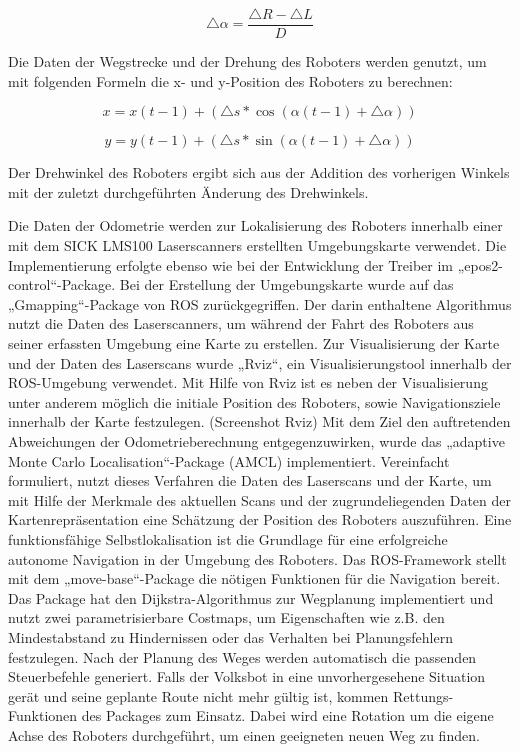 \begin{equation}
\triangle \alpha = \dfrac{\triangle R - \triangle L}{D}
\end{equation} 

Die Daten der Wegstrecke und der Drehung des Roboters werden genutzt, um mit folgenden Formeln die x- und y-Position des Roboters zu berechnen:

\begin{equation}
x = x(t-1) + (\triangle s * \cos (\alpha (t-1) + \triangle \alpha))
\end{equation} 

\begin{equation}
y = y(t-1) + (\triangle s * \sin (\alpha (t-1) + \triangle \alpha))
\end{equation} 

Der Drehwinkel des Roboters ergibt sich aus der Addition des vorherigen Winkels mit der zuletzt durchgeführten Änderung des Drehwinkels.



Die Daten der Odometrie werden zur Lokalisierung des Roboters innerhalb einer mit dem SICK LMS100 Laserscanners erstellten Umgebungskarte verwendet. Die Implementierung erfolgte ebenso wie bei der Entwicklung der Treiber im „epos2-control“-Package. Bei der Erstellung der Umgebungskarte wurde auf das „Gmapping“-Package von ROS zurückgegriffen. Der darin enthaltene Algorithmus nutzt die Daten des Laserscanners, um während der Fahrt des Roboters aus seiner erfassten Umgebung eine Karte zu erstellen. Zur Visualisierung der Karte und der Daten des Laserscans wurde „Rviz“, ein Visualisierungstool innerhalb der ROS-Umgebung verwendet. Mit Hilfe von Rviz ist es neben der Visualisierung unter anderem möglich die initiale Position des Roboters, sowie Navigationsziele innerhalb der Karte festzulegen. (Screenshot Rviz) Mit dem Ziel den auftretenden Abweichungen der Odometrieberechnung entgegenzuwirken, wurde das „adaptive Monte Carlo Localisation“-Package (AMCL) implementiert. Vereinfacht formuliert, nutzt dieses Verfahren die Daten des Laserscans und der Karte, um mit Hilfe der Merkmale des aktuellen Scans und der zugrundeliegenden Daten der Kartenrepräsentation eine Schätzung der Position des Roboters auszuführen. \cite[S. 6]{Bischoff:2004}
Eine funktionsfähige Selbstlokalisation ist die Grundlage für eine erfolgreiche autonome Navigation in der Umgebung des Roboters. Das ROS-Framework stellt mit dem „move-base“-Package die nötigen Funktionen für die Navigation bereit. Das Package hat den Dijkstra-Algorithmus zur Wegplanung implementiert und nutzt zwei parametrisierbare Costmaps, um Eigenschaften wie z.B. den Mindestabstand zu Hindernissen oder das Verhalten bei Planungsfehlern festzulegen. Nach der Planung des Weges werden automatisch die passenden Steuerbefehle generiert. Falls der Volksbot in eine unvorhergesehene Situation gerät und seine geplante Route nicht mehr gültig ist, kommen Rettungs-Funktionen des Packages zum Einsatz. Dabei wird eine Rotation um die eigene Achse des Roboters durchgeführt, um einen geeigneten neuen Weg zu finden. 

